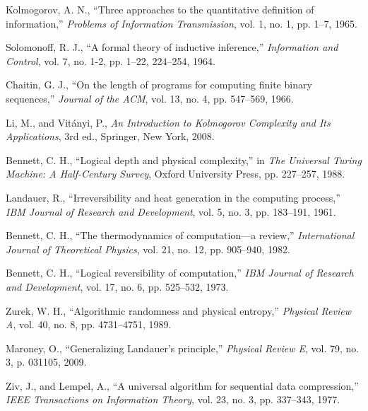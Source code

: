 \documentclass[12pt,a4paper]{report}
\begin{document}

\begin{thebibliography}{99}

Kolmogorov, A. N., ``Three approaches to the quantitative definition of information,'' \textit{Problems of Information Transmission}, vol. 1, no. 1, pp. 1--7, 1965.

Solomonoff, R. J., ``A formal theory of inductive inference,'' \textit{Information and Control}, vol. 7, no. 1-2, pp. 1--22, 224--254, 1964.

Chaitin, G. J., ``On the length of programs for computing finite binary sequences,'' \textit{Journal of the ACM}, vol. 13, no. 4, pp. 547--569, 1966.

Li, M., and Vitányi, P., \textit{An Introduction to Kolmogorov Complexity and Its Applications}, 3rd ed., Springer, New York, 2008.

Bennett, C. H., ``Logical depth and physical complexity,'' in \textit{The Universal Turing Machine: A Half-Century Survey}, Oxford University Press, pp. 227--257, 1988.

Landauer, R., ``Irreversibility and heat generation in the computing process,'' \textit{IBM Journal of Research and Development}, vol. 5, no. 3, pp. 183--191, 1961.

Bennett, C. H., ``The thermodynamics of computation—a review,'' \textit{International Journal of Theoretical Physics}, vol. 21, no. 12, pp. 905--940, 1982.

Bennett, C. H., ``Logical reversibility of computation,'' \textit{IBM Journal of Research and Development}, vol. 17, no. 6, pp. 525--532, 1973.

Zurek, W. H., ``Algorithmic randomness and physical entropy,'' \textit{Physical Review A}, vol. 40, no. 8, pp. 4731--4751, 1989.

Maroney, O., ``Generalizing Landauer's principle,'' \textit{Physical Review E}, vol. 79, no. 3, p. 031105, 2009.

Ziv, J., and Lempel, A., ``A universal algorithm for sequential data compression,'' \textit{IEEE Transactions on Information Theory}, vol. 23, no. 3, pp. 337--343, 1977.


\end{thebibliography}
\end{document}
